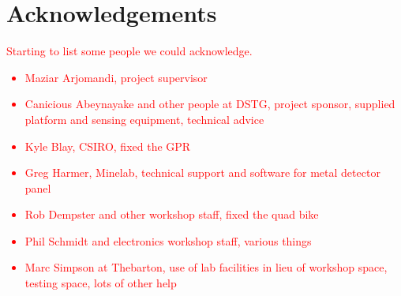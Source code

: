 \documentclass[main.tex]{subfiles}
\begin{document}
{}	%
\chapter*{Acknowledgements} 
\textcolor{red}{Starting to list some people we could acknowledge.
\begin{itemize}
\item Maziar Arjomandi, project supervisor
\item Canicious Abeynayake and other people at DSTG, project sponsor, supplied platform and sensing equipment, technical advice
\item Kyle Blay, CSIRO, fixed the GPR
\item Greg Harmer, Minelab, technical support and software for metal detector panel
\item Rob Dempster and other workshop staff, fixed the quad bike
\item Phil Schmidt and electronics workshop staff, various things
\item Marc Simpson at Thebarton, use of lab facilities in lieu of workshop space, testing space, lots of other help
\end{itemize}}
\newpage

{}	%
\renewcommand{\baselinestretch}{1.2}\normalsize 	%
\tableofcontents
\renewcommand{\baselinestretch}{1.3}\normalsize 	%
\newpage

{}	%
\listoffigures
\newpage

{}	%
\listoftables
\newpage


\printnomenclature
\newpage
\end{document}
